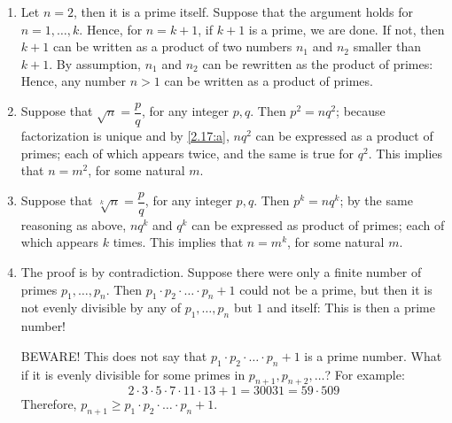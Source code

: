 \begin{solution} %
  \begin{enumerate}[label=(\alph*)]
    \item Let $n = 2$, then it is a prime itself. Suppose
    that the argument holds for $n=1,\dots,k$. Hence,
    for $n = k + 1$, if $k + 1$ is a prime, we are done. If not,
    then $k + 1$ can be written as a product
    of two numbers $n_1$ and $n_2$ smaller than $k + 1$.
    By assumption, $n_1$ and $n_2$ can be rewritten as
    the product of primes: Hence, any number $n > 1$
    can be written as a product of primes.
    \item Suppose that $\sqrt{n} = \dfrac{p}{q}$, for
    any integer $p,q$. Then $p^2 = nq^2$; because factorization
    is unique and by \ref{2.17:a}, $nq^2$ can be expressed
    as a product of primes; each of which appears
    twice, and the same is true for $q^2$.
    This implies that $n = m^2$, for some natural $m$.
    \item Suppose that $\sqrt[k]{n} = \dfrac{p}{q}$, for
    any integer $p,q$. Then $p^k = nq^k$; by the same
    reasoning as above, $nq^k$ and $q^k$ can be expressed
    as product of primes; each of which appears $k$ times.
    This implies that $n = m^k$, for some natural $m$.
    \item The proof is by contradiction. Suppose there were
    only a finite number of primes $p_1,\dots,p_n$. Then
    $p_1 \cdot p_2 \cdot \ldots \cdot p_n + 1$ could not
    be a prime, but then it is not evenly divisible by
    any of $p_1,\dots,p_n$ but $1$ and itself: This is
    then a prime number!
    \begin{ab}
      BEWARE! This does not say that
      $p_1 \cdot p_2 \cdot \ldots \cdot p_n + 1$ is
       a prime number. What if it is
      evenly divisible for some primes in
      $p_{n+1},p_{n+2},\dots$? For example:
      \begin{equation*}
        2 \cdot 3 \cdot 5 \cdot 7 \cdot 11 \cdot 13 + 1
        = 30031 = 59 \cdot 509
      \end{equation*}
      Therefore, $p_{n+1} \geq
      p_1 \cdot p_2 \cdot \ldots \cdot p_n + 1$.
    \end{ab}
  \end{enumerate}
\end{solution}

